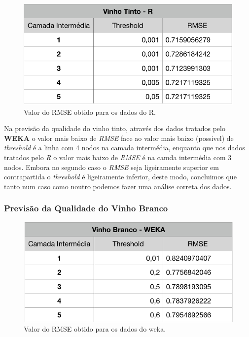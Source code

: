 \documentclass{report}
\begin{document}
\begin{figure}[H]
\centering
\includegraphics[scale=0.5]{tabelas/2} 
\caption{Valor do RMSE obtido para os dados do R.}
\end{figure} 


Na previsão da qualidade do vinho tinto, através dos dados tratados pelo \textbf{WEKA} o valor mais baixo de \textit{RMSE} face ao valor mais baixo (possivel) de \textit{threshold} é a linha com 4 nodos na camada intermédia, enquanto que nos dados tratados pelo \textit{R} o valor mais baixo de \textit{RMSE} é na camda intermédia com 3 nodos. Embora no segundo caso o \textit{RMSE} seja ligeiramente superior em contrapartida o \textit{threshold} é ligeiramente inferior, deste modo, concluimos que tanto num caso como noutro podemos fazer uma análise correta dos dados.






\subsubsection{Previsão da Qualidade do Vinho Branco}

\begin{figure}[H]
\centering
\includegraphics[scale=0.5]{tabelas/3} 
\caption{Valor do RMSE obtido para os dados do weka.}
\end{figure}
\end{document}
